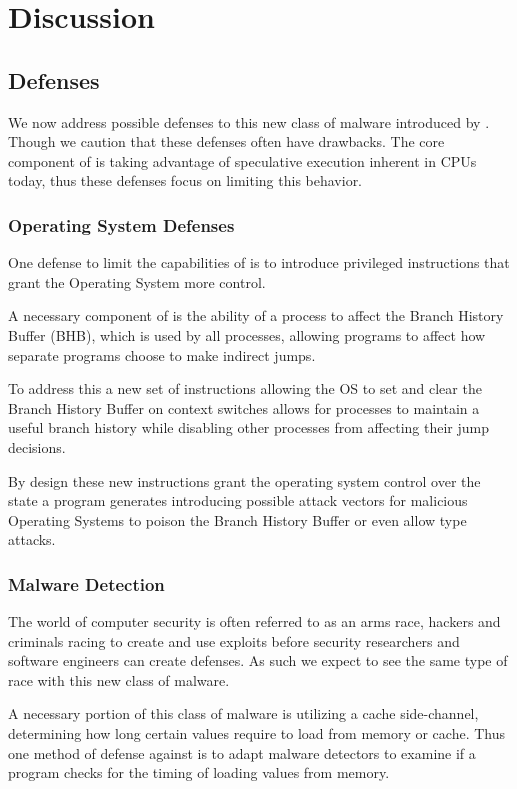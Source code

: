 
\section{Discussion}

\subsection{Defenses}
We now address possible defenses to this new class of malware introduced by
\speculake. Though we caution that these defenses often have drawbacks. The core
component of \speculake is taking advantage of speculative execution inherent in
CPUs today, thus these defenses focus on limiting this behavior.

\subsubsection{Operating System Defenses}
One defense to limit the capabilities of \speculake is to introduce privileged
instructions that grant the Operating System more control. 

A necessary component of \speculake is the ability of a process to affect the
Branch History Buffer (BHB), which is used by all processes, allowing programs
to affect how separate programs choose to make indirect jumps.

To address this a new set of instructions allowing the OS to set and clear the
Branch History Buffer on context switches allows for processes to maintain a
useful branch history while disabling other processes from affecting their jump
decisions.

By design these new instructions grant the operating system control over the
state a program generates introducing possible attack vectors for malicious
Operating Systems to poison the Branch History Buffer or even allow \speculake
type attacks.

\subsubsection{Malware Detection}
\label{subsubsec:malware}
The world of computer security is often referred to as an arms race, hackers and
criminals racing to create and use exploits before security researchers and
software engineers can create defenses. As such we expect to see the same type
of race with this new class of malware. 

A necessary portion of this class of malware is utilizing a cache side-channel,
determining how long certain values require to load from memory or cache. Thus
one method of defense against \speculake is to adapt malware detectors to
examine if a program checks for the timing of loading values from memory. 


